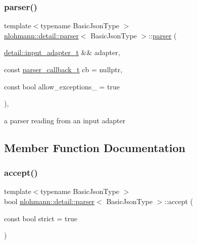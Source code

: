\subsubsection{\texorpdfstring{parser()}{parser()}}
{\footnotesize\ttfamily template$<$typename Basic\+Json\+Type $>$ \\
\hyperlink{classnlohmann_1_1detail_1_1parser}{nlohmann\+::detail\+::parser}$<$ Basic\+Json\+Type $>$\+::\hyperlink{classnlohmann_1_1detail_1_1parser}{parser} (\begin{DoxyParamCaption}\item[{\hyperlink{namespacenlohmann_1_1detail_ae132f8cd5bb24c5e9b40ad0eafedf1c2}{detail\+::input\+\_\+adapter\+\_\+t} \&\&}]{adapter,  }\item[{const \hyperlink{classnlohmann_1_1detail_1_1parser_ad250ad4f2b4af4a497e727c963162ff1}{parser\+\_\+callback\+\_\+t}}]{cb = {\ttfamily nullptr},  }\item[{const bool}]{allow\+\_\+exceptions\+\_\+ = {\ttfamily true} }\end{DoxyParamCaption})\hspace{0.3cm}{\ttfamily [inline]}, {\ttfamily [explicit]}}



a parser reading from an input adapter 



\subsection{Member Function Documentation}
\mbox{\label{classnlohmann_1_1detail_1_1parser_a20997b42262856935b60fc91bf05bf3f}} 
\subsubsection{\texorpdfstring{accept()}{accept()}}
{\footnotesize\ttfamily template$<$typename Basic\+Json\+Type $>$ \\
bool \hyperlink{classnlohmann_1_1detail_1_1parser}{nlohmann\+::detail\+::parser}$<$ Basic\+Json\+Type $>$\+::accept (\begin{DoxyParamCaption}\item[{const bool}]{strict = {\ttfamily true} }\end{DoxyParamCaption})\hspace{0.3cm}{\ttfamily [inline]}}



